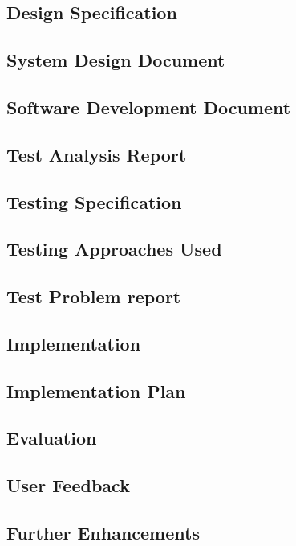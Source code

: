 \documentclass[a4paper,12pt]{article}
\begin{document}
\begin{samepage}
\section{Design Specification}
\subsection {System Design Document}
\subsection {Software Development Document}
\subsection {Test Analysis Report}
\end{samepage}
\begin{samepage}
\section {Testing Specification}
\subsection {Testing Approaches Used}
\subsection {Test Problem report}
\end{samepage}
\begin{samepage}
\section {Implementation}
\subsection {Implementation Plan}
\end{samepage}
\begin{samepage}
\section {Evaluation}
\subsection {User Feedback}
\subsection {Further Enhancements}
\end{samepage}
\end{document}
